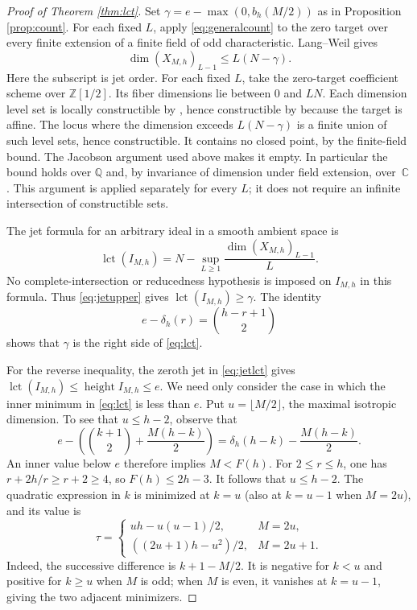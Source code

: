 \documentclass[11pt]{article}
\numberwithin{equation}{section}
\theoremstyle{remark}
\newcommand{\C}{\mathbb C}
\newcommand{\Z}{\mathbb Z}
\newcommand{\lct}{\operatorname{lct}}
\begin{document}
\begin{proof}[Proof of Theorem \ref{thm:lct}]
Set $\gamma=e-\max(0,b_h(M/2))$ as in
Proposition \ref{prop:count}. For each fixed $L$, apply
\eqref{eq:generalcount} to the zero target over every finite
extension of a finite field of odd characteristic. Lang--Weil
gives
\begin{equation}\label{eq:jetupper}
 \dim (X_{M,h})_{L-1}\le L(N-\gamma).
\end{equation}
Here the subscript is jet order. For each fixed $L$, take the
zero-target coefficient scheme over $\Z[1/2]$. Its fiber
dimensions lie between $0$ and $LN$. Each dimension level set is
locally constructible by \cite[Tag 05F9]{Stacks}, hence constructible
by \cite[Tag 054E]{Stacks} because the target is affine. The locus
where the dimension exceeds $L(N-\gamma)$ is a finite union of
such level sets, hence constructible. It contains no closed
point, by the finite-field bound. The Jacobson argument used
above makes it empty. In particular the bound holds over $\mathbb Q$
and, by invariance of dimension under field extension, over~$\C$. This argument is applied separately for every $L$; it
does not require an infinite intersection of constructible sets.

The jet formula for an arbitrary ideal in a smooth ambient
space \cite[Corollary 0.2]{Mpairs} is
\begin{equation}\label{eq:jetlct}
 \lct(I_{M,h})=N-
       \sup_{L\ge1}\frac{\dim(X_{M,h})_{L-1}}{L}.
\end{equation}
No complete-intersection or reducedness hypothesis is imposed
on $I_{M,h}$ in this formula.
Thus \eqref{eq:jetupper} gives $\lct(I_{M,h})\ge\gamma$.
The identity
\[
 e-\delta_h(r)=\binom{h-r+1}{2}
\]
shows that $\gamma$ is the right side of \eqref{eq:lct}.

For the reverse inequality, the zeroth jet in
\eqref{eq:jetlct} gives $\lct(I_{M,h})\le\operatorname{height}
I_{M,h}\le e$. We need only consider the case in which the
inner minimum in \eqref{eq:lct} is less than $e$.
Put $u=\lfloor M/2\rfloor$, the maximal isotropic dimension. To see that $u\le h-2$, observe that
\[
 e-\left(\binom{k+1}{2}+\frac{M(h-k)}2\right)
   =\delta_h(h-k)-\frac{M(h-k)}2.
\]
An inner value below $e$ therefore implies $M<F(h)$. For
$2\le r\le h$, one has $r+2h/r\ge r+2\ge4$, so $F(h)\le2h-3$.
It follows that $u\le h-2$.
The quadratic expression in $k$ is minimized at $k=u$
(also at $k=u-1$ when $M=2u$), and its value is
\begin{equation}\label{eq:tau}
 \tau=
 \begin{cases}
 uh-u(u-1)/2,&M=2u,\\
 ((2u+1)h-u^2)/2,&M=2u+1.
 \end{cases}
\end{equation}
Indeed, the successive difference is $k+1-M/2$. It is negative
for $k<u$ and positive for $k\ge u$ when $M$ is odd; when $M$ is
even, it vanishes at $k=u-1$, giving the two adjacent minimizers.


\end{proof}
\end{document}
